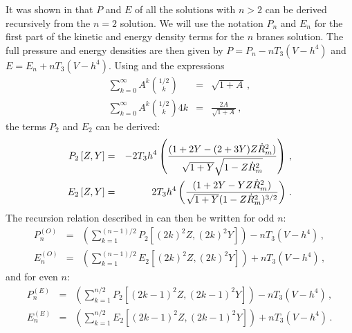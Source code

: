It was shown in  that $P$ and $E$ of all the solutions with $n>2$
can be derived recursively from the $n=2$ solution. We will use the notation
$P_n$ and $E_n$ for the first part of the kinetic and energy density terms for
the $n$ branes solution. The full pressure and energy densities are then 
given by $P = P_n - nT_3(V-h^4)$ and $E = E_n + nT_3 (V-h^4)$. Using
 and the expressions
% 
\begin{eqnarray}
 \sum_{k=0}^\infty A^k {1/2 \choose k} &=& \sqrt{1+A}\,,\\
 \sum_{k=0}^\infty A^k {1/2 \choose k} 4k &=& \frac{2A}{\sqrt{1+A}}\,,
\end{eqnarray}
% 
the terms $P_2$ and $E_2$ can be derived:
% 
\begin{eqnarray}
\label{eq:2brane}
P_2 \left[Z,Y\right] &=& - 2 T_3 h^4 \left(\frac{(1+2Y -
(2+3Y)Z\dot{R}_m^2)}{\sqrt{1+Y}\sqrt{1-Z\dot{R}_m^2}}\right) \,, \nonumber \\
E_2 \left[Z,Y\right] &=& 2 T_3 h^4 \left(\frac{(1+2Y -
YZ\dot{R}_m^2)}{\sqrt{1+Y}(1-Z\dot{R}_m^2)^{3/2}}\right) \,.
\end{eqnarray}
% 
% 
The recursion relation described in  can then be written for odd $n$:
% 
\begin{eqnarray}
\label{eq:oddbrane}
P_n^{(O)} &=& \left(\sum_{k=1}^{(n-1)/2} P_2 \left[(2k)^2Z, (2k)^2Y\right]
\right)-nT_3(V-h^4) \,, \nonumber \\
E_n^{(O)} &=& \left(\sum_{k=1}^{(n-1)/2} E_2 \left[(2k)^2Z, (2k)^2Y \right]
\right)+
nT_3(V-h^4) \,,
\end{eqnarray}
% 
and for even $n$:
%  
\begin{eqnarray}
\label{eq:evenbrane}
P_n^{(E)} &=& \left(\sum_{k=1}^{n/2} P_2 \left[(2k-1)^2Z, (2k-1)^2Y\right]
\right)-nT_3(V-h^4) \,, \nonumber \\
E_n^{(E)} &=& \left(\sum_{k=1}^{n/2} E_2 \left[(2k-1)^2Z, (2k-1)^2Y \right]
\right)+
nT_3(V-h^4) \,.
\end{eqnarray}
% 


